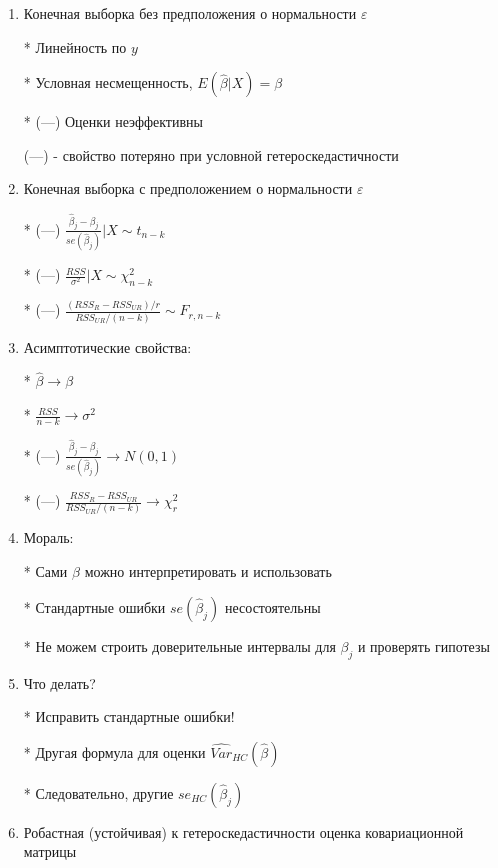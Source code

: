 \documentclass[12pt,a4paper]{article}
\begin{document}
{\begin{enumerate}
- конечная выборка с предположением о нормальности $\varepsilon$

- асимптотические свойства (без предположения о нормальности  $\varepsilon$)

Что происходит в каждом случае?

\item Конечная выборка без предположения о нормальности $\varepsilon$

* Линейность по $y$

* Условная несмещенность, $E(\hat{\beta}|X)=\beta$

* (---) Оценки неэффективны

(---) - свойство потеряно при условной гетероскедастичности

\newpage
\item  Конечная выборка с предположением о нормальности $\varepsilon$

* (---) $\frac{\hat{\beta}_j-\beta_j}{se(\hat{\beta}_j)} | X \sim t_{n-k}$

* (---) $\frac{RSS}{\sigma^2} |X \sim \chi^2_{n-k}$

* (---) $\frac{(RSS_R-RSS_{UR})/r}{RSS_{UR}/(n-k)} \sim F_{r,n-k}$

\item  Асимптотические свойства:

*  $\hat{\beta} \to \beta $

* $\frac{RSS}{n-k} \to \sigma^2 $

* (---) $\frac{\hat{\beta}_j-\beta_j}{se(\hat{\beta}_j)} \to N(0,1)$

* (---) $\frac{RSS_R-RSS_{UR}}{RSS_{UR}/(n-k)} \to \chi^2_r$

\newpage
\item Мораль:

* Сами $\hat{\beta}$ можно интерпретировать и использовать

* Стандартные ошибки $se(\hat{\beta}_j)$ несостоятельны

* Не можем строить доверительные интервалы для $\beta_j$ и проверять гипотезы

\item Что делать?

* Исправить стандартные ошибки! 

* Другая формула для оценки $\widehat{Var}_{HC}(\hat{\beta})$

* Следовательно, другие $se_{HC}(\hat{\beta}_j)$


\item Робастная (устойчивая) к гетероскедастичности оценка ковариационной матрицы


\end{enumerate}}
\end{document}
